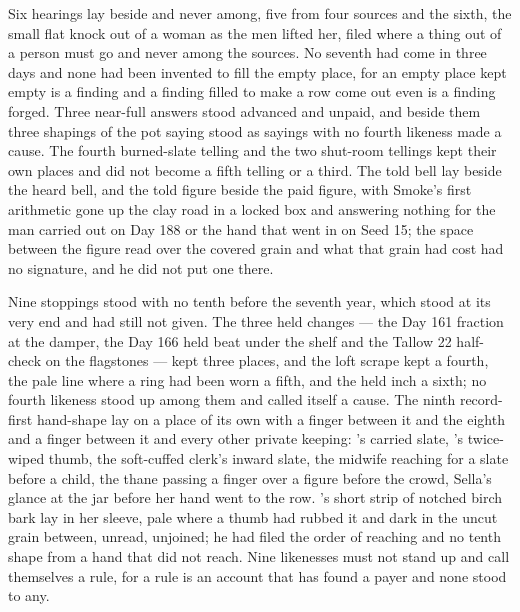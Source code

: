 Six hearings lay beside and never among, five from four sources and the sixth, the small flat knock out of a woman as the men lifted her, filed where a thing out of a person must go and never among the sources. No seventh had come in three days and none had been invented to fill the empty place, for an empty place kept empty is a finding and a finding filled to make a row come out even is a finding forged. Three near-full answers stood advanced and unpaid, and beside them three shapings of the pot saying stood as sayings with no fourth likeness made a cause. The fourth burned-slate telling and the two shut-room tellings kept their own places and did not become a fifth telling or a third. The told bell lay beside the heard bell, and the told figure beside the paid figure, with Smoke's first arithmetic gone up the clay road in a locked box and answering nothing for the man carried out on Day 188 or the hand that went in on Seed 15; the space between the figure read over the covered grain and what that grain had cost had no signature, and he did not put one there.

Nine stoppings stood with no tenth before the seventh year, which stood at its very end and had still not given. The three held changes --- the Day 161 fraction at the damper, the Day 166 held beat under the shelf and the Tallow 22 half-check on the flagstones --- kept three places, and the loft scrape kept a fourth, the pale line where a ring had been worn a fifth, and the held inch a sixth; no fourth likeness stood up among them and called itself a cause. The ninth record-first hand-shape lay on a place of its own with a finger between it and the eighth and a finger between it and every other private keeping: 's carried slate, 's twice-wiped thumb, the soft-cuffed clerk's inward slate, the midwife reaching for a slate before a child, the thane passing a finger over a figure before the crowd, Sella's glance at the jar before her hand went to the row. 's short strip of notched birch bark lay in her sleeve, pale where a thumb had rubbed it and dark in the uncut grain between, unread, unjoined; he had filed the order of reaching and no tenth shape from a hand that did not reach. Nine likenesses must not stand up and call themselves a rule, for a rule is an account that has found a payer and none stood to any.

